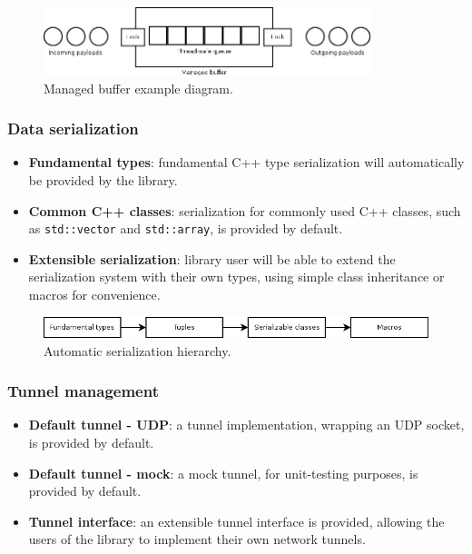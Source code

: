 \documentclass[11pt]{report}
\newcommand{\+}{\discretionary{\mbox{\scriptsize$\hookleftarrow$}}{}{}}
\renewcommand\emph{\textbf}
\begin{document}
                    
                    \begin{figure}[!htb]
                    \caption{Managed buffer example diagram.}
                    \centering
                    \includegraphics[width=0.85\textwidth]{d/other/managedbuf.png}
                    \end{figure}

                 \subsubsection{Data serialization}
                    \begin{itemize}
                        \item \emph{Fundamental types}: fundamental C++ type serialization will automatically be provided by the library.
                        \item \emph{Common C++ classes}: serialization for commonly used C++ classes, such as \texttt{std::vector} and \texttt{std::array}, is provided by default.
                        \item \emph{Extensible serialization}: library user will be able to extend the serialization system with their own types, using simple class inheritance or macros for convenience.
                    \end{itemize}

                    
                    \begin{figure}[!htb]
                    \caption{Automatic serialization hierarchy.}
                    \centering
                    \includegraphics[width=1\textwidth]{d/other/serialization.png}
                    \end{figure}

                  \subsubsection{Tunnel management}
                    \begin{itemize}
                        \item \emph{Default tunnel - UDP}: a tunnel implementation, wrapping an UDP socket, is provided by default.
                        \item \emph{Default tunnel - mock}: a mock tunnel, for unit-testing purposes, is provided by default.
                        \item \emph{Tunnel interface}: an extensible tunnel interface is provided, allowing the users of the library to implement their own network tunnels.
                    \end{itemize}
\end{document}
